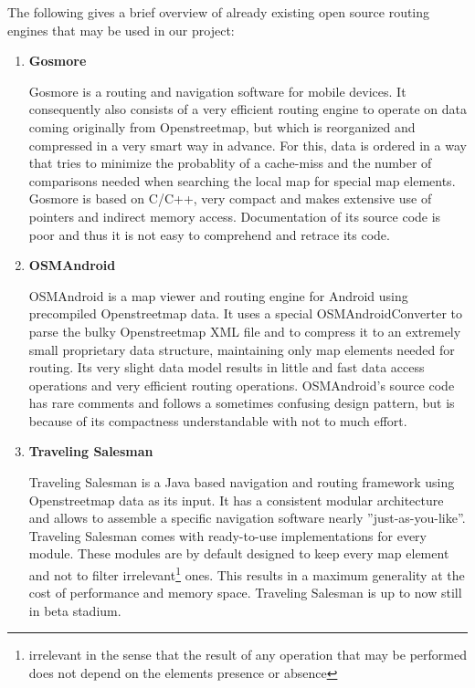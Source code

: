 The following gives a brief overview of already existing open source routing engines that may be used in our project:

\begin{enumerate}

	\item \textbf{Gosmore}
	
		Gosmore is a routing and navigation software for mobile devices. It consequently also consists of a very efficient routing engine to operate on data coming originally from Openstreetmap, but which is reorganized and compressed in a very smart way in advance. For this, data is ordered in a way that tries to minimize the probablity of a cache-miss and the number of comparisons needed when searching the local map for special map elements.
		Gosmore is based on C/C++, very compact and makes extensive use of pointers and indirect memory access. Documentation of its source code is poor and thus it is not easy to comprehend and retrace its code.
	
	\item \textbf{OSMAndroid}
	
		OSMAndroid is a map viewer and routing engine for Android using precompiled Openstreetmap data. It uses a special OSMAndroidConverter to parse the bulky Openstreetmap XML file and to compress it to an extremely small 	proprietary data structure, maintaining only map elements needed for routing. Its very slight data model results in little and fast data access operations and very efficient routing operations.
		OSMAndroid's source code has rare comments and follows a sometimes confusing design pattern, but is because of its compactness understandable with not to much effort.
	
	\item \textbf{Traveling Salesman}
	
		Traveling Salesman is a Java based navigation and routing framework using Openstreetmap data as its input. It has a consistent modular architecture and allows to assemble a specific navigation software nearly ''just-as-you-like''. Traveling Salesman comes with ready-to-use implementations for every module. These modules are by default designed to keep every map element and not to filter irrelevant\footnote{irrelevant in the sense that the result of any operation that may be performed does not depend on the elements presence or absence} ones. This results in a maximum generality at the cost of performance and memory space.
		Traveling Salesman is up to now still in beta stadium.

\end{enumerate}

